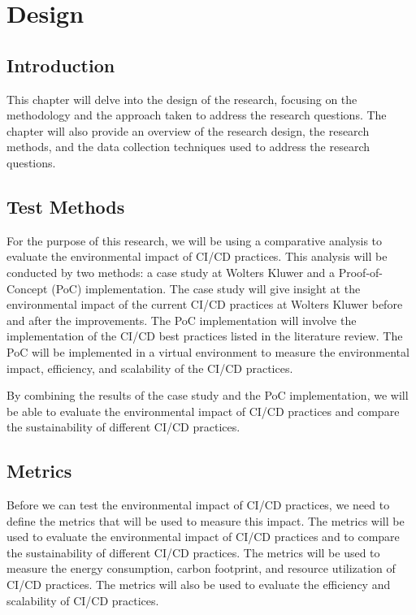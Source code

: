 
\chapter{Design}%
\label{ch:design}

\section{Introduction}%
\label{sec:introduction-design}

This chapter will delve into the design of the research, focusing on the methodology and the approach taken to address the research questions. The chapter will also provide an overview of the research design, the research methods, and the data collection techniques used to address the research questions.

\section{Test Methods}%
\label{sec:test-methods}

For the purpose of this research, we will be using a comparative analysis to evaluate the environmental impact of CI/CD practices. This analysis will be conducted by two methods: a case study at Wolters Kluwer and a Proof-of-Concept (PoC) implementation. 
The case study will give insight at the environmental impact of the current CI/CD practices at Wolters Kluwer before and after the improvements. 
The PoC implementation will involve the implementation of the CI/CD best practices listed in the literature review. The PoC will be implemented in a virtual environment to measure the environmental impact, efficiency, and scalability of the CI/CD practices.

By combining the results of the case study and the PoC implementation, we will be able to evaluate the environmental impact of CI/CD practices and compare the sustainability of different CI/CD practices.

\section{Metrics}%
\label{sec:metrics}

Before we can test the environmental impact of CI/CD practices, we need to define the metrics that will be used to measure this impact. The metrics will be used to evaluate the environmental impact of CI/CD practices and to compare the sustainability of different CI/CD practices. The metrics will be used to measure the energy consumption, carbon footprint, and resource utilization of CI/CD practices. The metrics will also be used to evaluate the efficiency and scalability of CI/CD practices.

